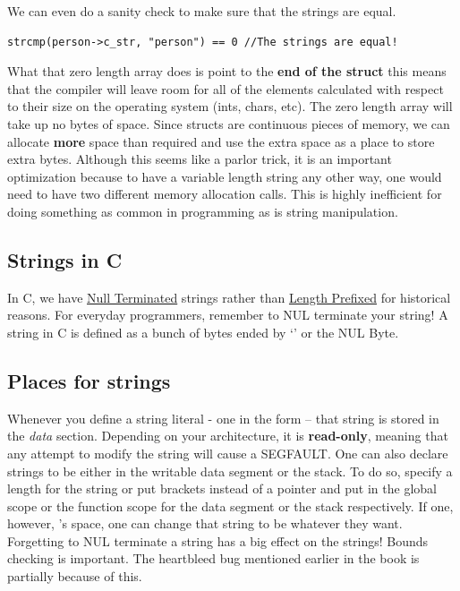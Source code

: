 We can even do a sanity check to make sure that the strings are equal.

\begin{verbatim}
strcmp(person->c_str, "person") == 0 //The strings are equal!
\end{verbatim}

What that zero length array does is point to the \textbf{end of the struct} this means that the compiler will leave room for all of the elements calculated with respect to their size on the operating system (ints, chars, etc).
The zero length array will take up no bytes of space.
Since structs are continuous pieces of memory, we can allocate \textbf{more} space than required and use the extra space as a place to store extra bytes.
Although this seems like a parlor trick, it is an important optimization because to have a variable length string any other way, one would need to have two different memory allocation calls.
This is highly inefficient for doing something as common in programming as is string manipulation.

\subsection{Strings in C}

In C, we have
\href{https://en.wikipedia.org/wiki/Null-terminated_string}{Null
	Terminated} strings rather than
\href{https://en.wikipedia.org/wiki/String_(computer_science)\#Length-prefixed}{Length
	Prefixed} for historical reasons.
For everyday programmers, remember to NUL terminate your string!
A string in C is defined as a bunch of bytes ended by `\0' or the NUL Byte.

\subsection{Places for strings}

Whenever you define a string literal - one in the form  -- that string is stored in the \emph{data} section. Depending on your architecture, it is \textbf{read-only}, meaning that any attempt to modify the string will cause a SEGFAULT.
One can also declare strings to be either in the writable data segment or the stack. To do so, specify a length for the string or put brackets instead of a pointer  and put in the global scope or the function scope for the data segment or the stack respectively.
If one, however, 's space, one can change that string to be whatever they want.
Forgetting to NUL terminate a string has a big effect on the strings! Bounds checking is important.
The heartbleed bug mentioned earlier in the book is partially because of this.

